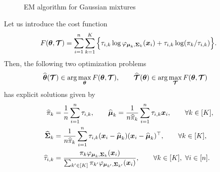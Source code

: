 \begin{figure}[ht]
\begin{center}
   \caption{EM algorithm for Gaussian mixtures}
   \label{algo:EM}
\end{center}
\end{figure}
\begin{lem}
\label{lemma1}
Let us introduce the cost function
\begin{equation}
\label{cost_gmm_em}
F({\boldsymbol\theta},\boldsymbol{\mathcal T}) = \sum_{i=1}^{n} \sum_{k=1}^K \Big\{\tau_{i,k}\log\varphi_{\boldsymbol\mu_{k},\boldsymbol\Sigma_{k}}(\boldsymbol x_i)+\tau_{i,k}
    \log(\pi_k/\tau_{i,k})\Big\}.
\end{equation}
Then, the following two optimization problems
\begin{align}
\widehat{{\boldsymbol\theta}}(\boldsymbol{\mathcal T})&\in \arg\max_{{\boldsymbol\theta}} F({\boldsymbol\theta},\boldsymbol{\mathcal T}),\qquad \widehat{\boldsymbol{\mathcal T}}({\boldsymbol\theta})\in \arg\max_{\boldsymbol{\mathcal T}} F({\boldsymbol\theta},\boldsymbol{\mathcal T})
\end{align}
has explicit solutions given by
\begin{align}
\label{em-sols}
\widehat\pi_k     &= \frac1n\sum_{i=1}^n \tau_{i,k},\qquad\widehat{\boldsymbol\mu}_k = \frac1{n\widehat\pi_k}\sum_{i=1}^n \tau_{i,k}\boldsymbol x_i ,\qquad \forall k\in[K],\\
\widehat{\boldsymbol\Sigma}_k &= \frac1{n\widehat\pi_k}\sum_{i=1}^n \tau_{i,k}(\boldsymbol x_i-\widehat{\boldsymbol\mu}_k)(\boldsymbol x_i-\widehat{\boldsymbol\mu}_k)^\top,\qquad\forall k\in[K],\\
\widehat\tau_{i,k}&= \frac{\pi_k\varphi_{\boldsymbol\mu_k,\boldsymbol\Sigma_k}(\boldsymbol x_i)}{\sum_{k'\in[K]}\pi_{k'}\varphi_{\boldsymbol\mu_{k'},\boldsymbol\Sigma_{k'}}(\boldsymbol x_i)},\qquad\forall k\in[K],\ \forall i\in[n] \label{tau_ik_em}.
\end{align}
\end{lem}
